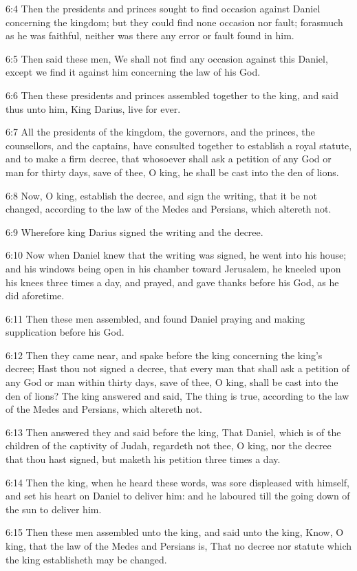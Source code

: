 6:4 Then the presidents and princes sought to find occasion against Daniel concerning the kingdom; but they could find none occasion nor fault; forasmuch as he was faithful, neither was there any error or fault found in him.

6:5 Then said these men, We shall not find any occasion against this Daniel, except we find it against him concerning the law of his God.

6:6 Then these presidents and princes assembled together to the king, and said thus unto him, King Darius, live for ever.

6:7 All the presidents of the kingdom, the governors, and the princes, the counsellors, and the captains, have consulted together to establish a royal statute, and to make a firm decree, that whosoever shall ask a petition of any God or man for thirty days, save of thee, O king, he shall be cast into the den of lions.

6:8 Now, O king, establish the decree, and sign the writing, that it be not changed, according to the law of the Medes and Persians, which altereth not.

6:9 Wherefore king Darius signed the writing and the decree.

6:10 Now when Daniel knew that the writing was signed, he went into his house; and his windows being open in his chamber toward Jerusalem, he kneeled upon his knees three times a day, and prayed, and gave thanks before his God, as he did aforetime.

6:11 Then these men assembled, and found Daniel praying and making supplication before his God.

6:12 Then they came near, and spake before the king concerning the king's decree; Hast thou not signed a decree, that every man that shall ask a petition of any God or man within thirty days, save of thee, O king, shall be cast into the den of lions? The king answered and said, The thing is true, according to the law of the Medes and Persians, which altereth not.

6:13 Then answered they and said before the king, That Daniel, which is of the children of the captivity of Judah, regardeth not thee, O king, nor the decree that thou hast signed, but maketh his petition three times a day.

6:14 Then the king, when he heard these words, was sore displeased with himself, and set his heart on Daniel to deliver him: and he laboured till the going down of the sun to deliver him.

6:15 Then these men assembled unto the king, and said unto the king, Know, O king, that the law of the Medes and Persians is, That no decree nor statute which the king establisheth may be changed.

